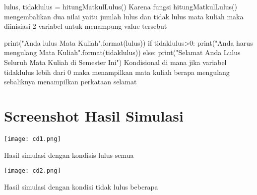 \documentclass[a4paper]{article}
\begin{document}
lulus, tidaklulus = hitungMatkulLulus()
Karena fungsi hitungMatkulLulus() mengembalikan dua nilai yaitu jumlah lulus dan tidak lulus mata kuliah maka diinisiasi 2 variabel untuk menampung value tersebut

print("Anda lulus {} Mata Kuliah".format(lulus))
if tidaklulus>0:
    print("Anda harus mengulang {} Mata Kuliah".format(tidaklulus))
else:
    print("Selamat Anda Lulus Seluruh Mata Kuliah di Semester Ini")
Kondisional di mana jika variabel tidaklulus lebih dari 0 maka menampilkan mata kuliah berapa mengulang sebaliknya menampilkan perkataan selamat


\section{Screenshot Hasil Simulasi}
    \centering
    \texttt{[image: cd1.png]}
    \caption{Hasil simulasi dengan kondisis lulus semua}
    \centering
    \texttt{[image: cd2.png]}
    \caption{Hasil simulasi dengan kondisi tidak lulus beberapa}
\end{document}
